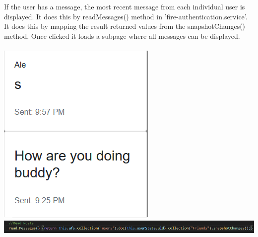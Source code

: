 \\\\
If the user has a message, the most recent message from each individual user is displayed. It does this by readMessages() method in 'fire-authentication.service'. It does this by mapping the result returned values from the snapshotChanges() method. Once clicked it loads a subpage where all messages can be displayed.
\\\\
\includegraphics[scale=0.4]{./img/DisplayMessages.png}
\includegraphics[scale=0.3]{./img/ReadMessage.png} 


